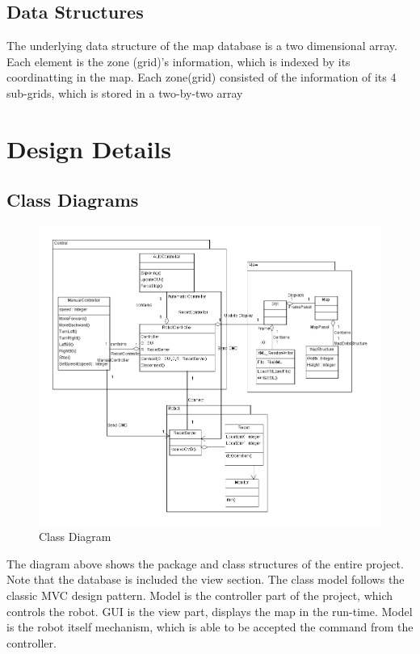 \documentclass[11pt, a4paper]{report}
\begin{document}
\section{Data Structures}
The underlying data structure of the map database is a two dimensional array. Each element
is the zone (grid)'s information, which is indexed by its coordinatting in the map. Each zone(grid)
consisted of the information of its 4 sub-grids, which is stored in a two-by-two array


\pagebreak

\chapter{Design Details}%
\label{cha:DD2}


\section{Class Diagrams}

\begin{figure}[h]
  \centering
    \includegraphics[width=16cm]{SEP_13_Class_Diagram.png}
  \caption{Class Diagram}
\end{figure}
The diagram above shows the package and class structures of the entire project. Note that the database
is included the view section. The class model follows the classic MVC design pattern. Model is the controller part of the project, which controls the robot. GUI is the view part, displays the map in the run-time. Model is the robot itself mechanism, which is able to be accepted the command from the controller.
\newpage
\end{document}
